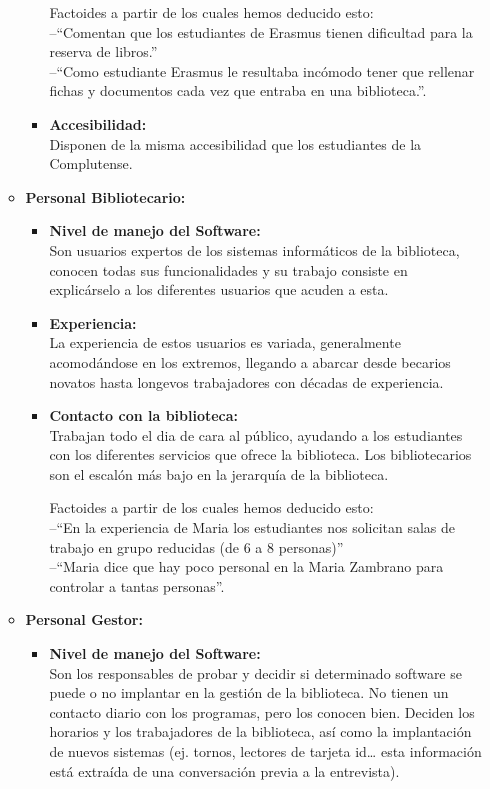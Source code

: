 \documentclass[12pt]{article}
\begin{document}
\begin{itemize}
\begin{itemize}
\begin{itemize}
			Factoides a partir de los cuales hemos deducido esto: \\ --``Comentan que los estudiantes de Erasmus tienen dificultad para la reserva de libros.'' \\ --``Como estudiante Erasmus le resultaba incómodo tener que rellenar fichas y documentos cada vez que entraba en una biblioteca.''.

		\item \textbf{Accesibilidad: \\}
			Disponen de la misma accesibilidad que los estudiantes de la Complutense.

	\end{itemize}
	\item \textbf{Personal Bibliotecario: }
	\begin{itemize}
		\item \textbf{Nivel de manejo del Software: \\}
			Son usuarios expertos de los sistemas informáticos de la biblioteca, conocen todas sus funcionalidades y su trabajo consiste en explicárselo a los diferentes usuarios que acuden a esta.
			
		\item \textbf{Experiencia: \\}
			La experiencia de estos usuarios es variada, generalmente acomodándose en los extremos, llegando a abarcar desde becarios novatos hasta longevos trabajadores con décadas de experiencia.
			
		\item \textbf{Contacto con la biblioteca: \\}
			Trabajan todo el dia de cara al público, ayudando a los estudiantes con los diferentes servicios que ofrece la biblioteca. Los bibliotecarios son el escalón más bajo en la jerarquía de la biblioteca.
			
			Factoides a partir de los cuales hemos deducido esto: \\ --``En la experiencia de Maria los estudiantes nos solicitan salas de trabajo en grupo reducidas (de 6 a 8 personas)'' \\ --``Maria dice que hay poco personal en la Maria Zambrano para controlar a tantas personas''.
			\newpage
			
	\end{itemize}
	\item \textbf{Personal Gestor: }
	\begin{itemize}
		\item \textbf{Nivel de manejo del Software: \\}
			Son los responsables de probar y decidir si determinado software se puede o no implantar en la gestión de la biblioteca. No tienen un contacto diario con los programas, pero los conocen bien. Deciden los horarios y los trabajadores de la biblioteca, así como la implantación de nuevos sistemas (ej. tornos, lectores de tarjeta id… esta información está extraída de una conversación previa a la entrevista).
			

\end{itemize}
\end{itemize}
\end{itemize}
\end{document}
